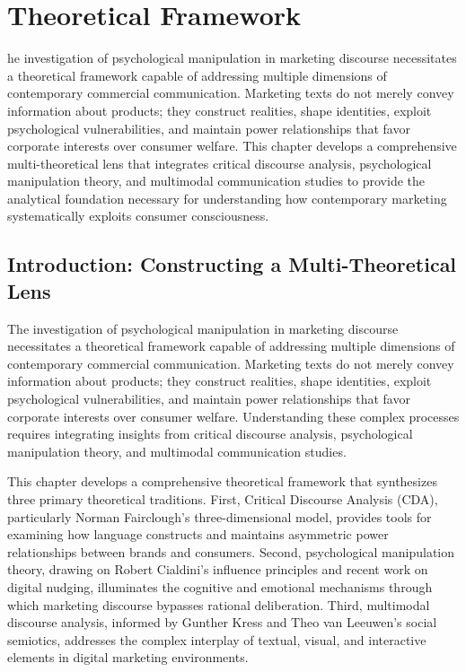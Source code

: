 
\chapter{Theoretical Framework}
\label{ch:theory}

he investigation of psychological manipulation in marketing discourse necessitates a theoretical framework capable of addressing multiple dimensions of contemporary commercial communication. Marketing texts do not merely convey information about products; they construct realities, shape identities, exploit psychological vulnerabilities, and maintain power relationships that favor corporate interests over consumer welfare. This chapter develops a comprehensive multi-theoretical lens that integrates critical discourse analysis, psychological manipulation theory, and multimodal communication studies to provide the analytical foundation necessary for understanding how contemporary marketing systematically exploits consumer consciousness.

\section{Introduction: Constructing a Multi-Theoretical Lens}
\label{sec:theory_intro}

The investigation of psychological manipulation in marketing discourse necessitates a theoretical framework capable of addressing multiple dimensions of contemporary commercial communication. Marketing texts do not merely convey information about products; they construct realities, shape identities, exploit psychological vulnerabilities, and maintain power relationships that favor corporate interests over consumer welfare. Understanding these complex processes requires integrating insights from critical discourse analysis, psychological manipulation theory, and multimodal communication studies.

This chapter develops a comprehensive theoretical framework that synthesizes three primary theoretical traditions. First, Critical Discourse Analysis (CDA), particularly Norman Fairclough's three-dimensional model, provides tools for examining how language constructs and maintains asymmetric power relationships between brands and consumers. Second, psychological manipulation theory, drawing on Robert Cialdini's influence principles and recent work on digital nudging, illuminates the cognitive and emotional mechanisms through which marketing discourse bypasses rational deliberation. Third, multimodal discourse analysis, informed by Gunther Kress and Theo van Leeuwen's social semiotics, addresses the complex interplay of textual, visual, and interactive elements in digital marketing environments.

